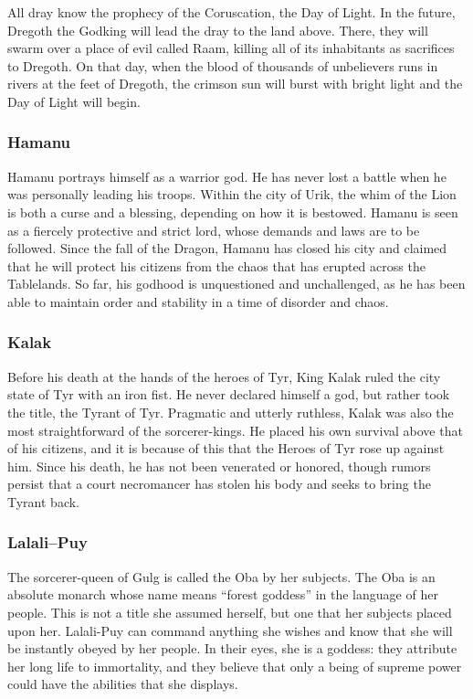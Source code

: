 All dray know the prophecy of the Coruscation, the Day of Light. In the future, Dregoth the Godking will lead the dray to the land above. There, they will swarm over a place of evil called Raam, killing all of its inhabitants as sacrifices to Dregoth. On that day, when the blood of thousands of unbelievers runs in rivers at the feet of Dregoth, the crimson sun will burst with bright light and the Day of Light will begin.

\subsubsection{Hamanu}
Hamanu portrays himself as a warrior god. He has never lost a battle when he was personally leading his troops. Within the city of Urik, the whim of the Lion is both a curse and a blessing, depending on how it is bestowed. Hamanu is seen as a fiercely protective and strict lord, whose demands and laws are to be followed. Since the fall of the Dragon, Hamanu has closed his city and claimed that he will protect his citizens from the chaos that has erupted across the Tablelands. So far, his godhood is unquestioned and unchallenged, as he has been able to maintain order and stability in a time of disorder and chaos.

\subsubsection{Kalak}
Before his death at the hands of the heroes of Tyr, King Kalak ruled the city state of Tyr with an iron fist. He never declared himself a god, but rather took the title, the Tyrant of Tyr. Pragmatic and utterly ruthless, Kalak was also the most straightforward of the sorcerer-kings. He placed his own survival above that of his citizens, and it is because of this that the Heroes of Tyr rose up against him. Since his death, he has not been venerated or honored, though rumors persist that a court necromancer has stolen his body and seeks to bring the Tyrant back.

\subsubsection{Lalali–Puy}
The sorcerer-queen of Gulg is called the Oba by her subjects. The Oba is an absolute monarch whose name means ``forest goddess'' in the language of her people. This is not a title she assumed herself, but one that her subjects placed upon her. Lalali-Puy can command anything she wishes and know that she will be instantly obeyed by her people. In their eyes, she is a goddess: they attribute her long life to immortality, and they believe that only a being of supreme power could have the abilities that she displays.

